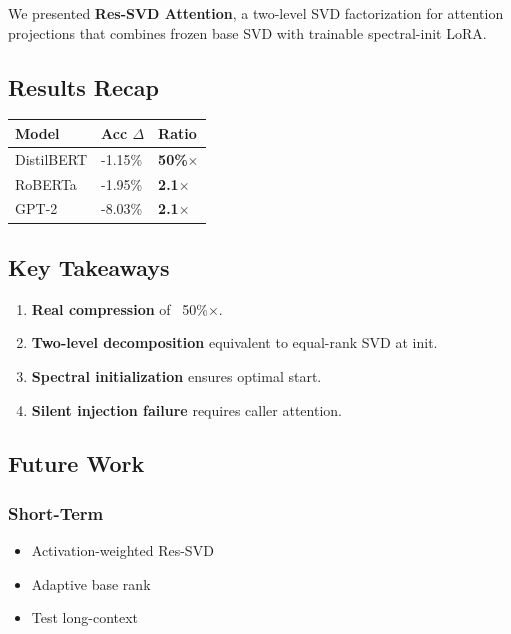 We presented \textbf{Res-SVD Attention}, a two-level SVD factorization for 
attention projections that combines frozen base SVD with trainable 
spectral-init LoRA.

\subsection{Results Recap}

\begin{table}[H]
\centering
\small
\begin{tabular}{lll}
\toprule
\textbf{Model} & \textbf{Acc $\Delta$} & \textbf{Ratio} \\
\midrule
DistilBERT & -1.15\% & \textbf{50\%$\times$} \\
RoBERTa & -1.95\% & \textbf{2.1$\times$} \\
GPT-2 & -8.03\% & \textbf{2.1$\times$} \\
\bottomrule
\end{tabular}
\end{table}

\subsection{Key Takeaways}

\begin{enumerate}
\item \textbf{Real compression} of ~50\%$\times$.
\item \textbf{Two-level decomposition} equivalent to equal-rank SVD at init.
\item \textbf{Spectral initialization} ensures optimal start.
\item \textbf{Silent injection failure} requires caller attention.

\end{enumerate}
\subsection{Future Work}

\subsubsection{Short-Term}
\begin{itemize}
\item Activation-weighted Res-SVD
\item Adaptive base rank
\item Test long-context

\end{itemize}

